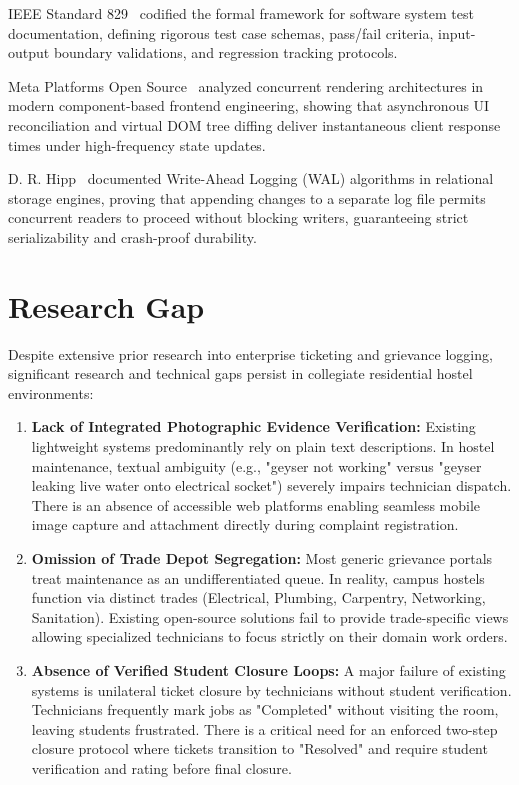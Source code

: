 \documentclass[10pt]{report}
\begin{document}
IEEE Standard 829~\cite{ieee829} codified the formal framework for software system test documentation, defining rigorous test case schemas, pass/fail criteria, input-output boundary validations, and regression tracking protocols.

Meta Platforms Open Source~\cite{reactdocs} analyzed concurrent rendering architectures in modern component-based frontend engineering, showing that asynchronous UI reconciliation and virtual DOM tree diffing deliver instantaneous client response times under high-frequency state updates.

D. R. Hipp~\cite{sqlitewal} documented Write-Ahead Logging (WAL) algorithms in relational storage engines, proving that appending changes to a separate log file permits concurrent readers to proceed without blocking writers, guaranteeing strict serializability and crash-proof durability.

\section{Research Gap}
\hspace{0.5cm}Despite extensive prior research into enterprise ticketing and grievance logging, significant research and technical gaps persist in collegiate residential hostel environments:
\begin{enumerate}
\item \textbf{Lack of Integrated Photographic Evidence Verification:} Existing lightweight systems predominantly rely on plain text descriptions. In hostel maintenance, textual ambiguity (e.g., "geyser not working" versus "geyser leaking live water onto electrical socket") severely impairs technician dispatch. There is an absence of accessible web platforms enabling seamless mobile image capture and attachment directly during complaint registration.
\item \textbf{Omission of Trade Depot Segregation:} Most generic grievance portals treat maintenance as an undifferentiated queue. In reality, campus hostels function via distinct trades (Electrical, Plumbing, Carpentry, Networking, Sanitation). Existing open-source solutions fail to provide trade-specific views allowing specialized technicians to focus strictly on their domain work orders.
\item \textbf{Absence of Verified Student Closure Loops:} A major failure of existing systems is unilateral ticket closure by technicians without student verification. Technicians frequently mark jobs as "Completed" without visiting the room, leaving students frustrated. There is a critical need for an enforced two-step closure protocol where tickets transition to "Resolved" and require student verification and rating before final closure.
\end{enumerate}
\end{document}
